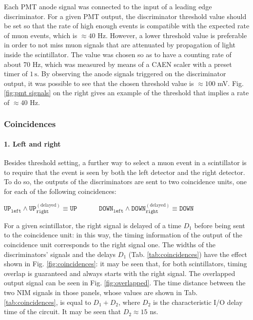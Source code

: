 \documentclass[a4paper]{article}
\begin{document}
Each PMT anode signal was connected to the input of a leading edge discriminator. For a given PMT output, the discriminator threshold value should be set so that the rate of high enough events is compatible with the expected rate of muon events, which is $\approx\!40$ Hz. However, a lower threshold value is preferable in order to not miss muon signals that are attenuated by propagation of light inside the scintillator. The value was chosen so as to have a counting rate of about 70 Hz, which was measured by means of a CAEN scaler with a preset timer of $1\,\mathrm{s}$. By observing the anode signals triggered on the discriminator output, it was possible to see that the chosen threshold value is $\approx\!100$ mV. Fig. \ref{fig:pmt signals} on the right gives an example of the threshold that implies a rate of $\approx\!40$ Hz.



\subsubsection{Coincidences} 
\hypertarget{2.1.2}{}
\paragraph{1. Left and right} Besides threshold setting, a further way to select a muon event in a scintillator is to require that the event is seen by both the left detector and the right detector. 
To do so, the outputs of the discriminators are sent to two coincidence units, one for each of the following coincidences: 
\begin{center}
$\mathtt{UP_{left}\wedge UP_{right}^\mathrm{(delayed)}\equiv UP}$ $~~~~~~~~~~~~~\mathtt{DOWN_{left}\wedge DOWN_{right}^\mathrm{(delayed)}\equiv DOWN}$ %
\end{center}
For a given scintillator, the right signal is delayed of a time $D_1$ before being sent to the coincidence unit: in this way, the timing information of the output of the coincidence unit corresponds to the right signal one. 
The widths of the discriminators’ signals and the delays $D_1$ (Tab. \ref{tab:coincidences}) have the effect shown in Fig. \ref{fig:coincidences}: it may be seen that, for both scintillators, timing overlap is guaranteed and always starts with the right signal. 
The overlapped output signal can be seen in Fig. \ref{fig:overlapped}. %
The time distance between the two NIM signals in those panels, whose values are shown in Tab. \ref{tab:coincidences}, is equal to $D_1+D_2$, where $D_2$ is the characteristic I/O delay time of the circuit. It may be seen that $D_2\approx15$ ns.
\end{document}

